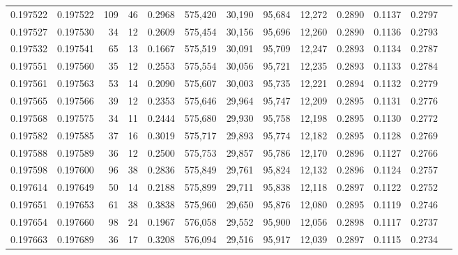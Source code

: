 \begin{tabular}{rrrrrrrrrrrrr}
0.197522 & 0.197522 &   109 &  46 &                                     0.2968 & 575,420 &  30,190 &  95,684 &  12,272 & 0.2890 & 0.1137 & 0.2797 \\
0.197527 & 0.197530 &    34 &  12 &                                     0.2609 & 575,454 &  30,156 &  95,696 &  12,260 & 0.2890 & 0.1136 & 0.2793 \\
0.197532 & 0.197541 &    65 &  13 &                                     0.1667 & 575,519 &  30,091 &  95,709 &  12,247 & 0.2893 & 0.1134 & 0.2787 \\
0.197551 & 0.197560 &    35 &  12 &                                     0.2553 & 575,554 &  30,056 &  95,721 &  12,235 & 0.2893 & 0.1133 & 0.2784 \\
0.197561 & 0.197563 &    53 &  14 &                                     0.2090 & 575,607 &  30,003 &  95,735 &  12,221 & 0.2894 & 0.1132 & 0.2779 \\
0.197565 & 0.197566 &    39 &  12 &                                     0.2353 & 575,646 &  29,964 &  95,747 &  12,209 & 0.2895 & 0.1131 & 0.2776 \\
0.197568 & 0.197575 &    34 &  11 &                                     0.2444 & 575,680 &  29,930 &  95,758 &  12,198 & 0.2895 & 0.1130 & 0.2772 \\
0.197582 & 0.197585 &    37 &  16 &                                     0.3019 & 575,717 &  29,893 &  95,774 &  12,182 & 0.2895 & 0.1128 & 0.2769 \\
0.197588 & 0.197589 &    36 &  12 &                                     0.2500 & 575,753 &  29,857 &  95,786 &  12,170 & 0.2896 & 0.1127 & 0.2766 \\
0.197598 & 0.197600 &    96 &  38 &                                     0.2836 & 575,849 &  29,761 &  95,824 &  12,132 & 0.2896 & 0.1124 & 0.2757 \\
0.197614 & 0.197649 &    50 &  14 &                                     0.2188 & 575,899 &  29,711 &  95,838 &  12,118 & 0.2897 & 0.1122 & 0.2752 \\
0.197651 & 0.197653 &    61 &  38 &                                     0.3838 & 575,960 &  29,650 &  95,876 &  12,080 & 0.2895 & 0.1119 & 0.2746 \\
0.197654 & 0.197660 &    98 &  24 &                                     0.1967 & 576,058 &  29,552 &  95,900 &  12,056 & 0.2898 & 0.1117 & 0.2737 \\
0.197663 & 0.197689 &    36 &  17 &                                     0.3208 & 576,094 &  29,516 &  95,917 &  12,039 & 0.2897 & 0.1115 & 0.2734 \\

\end{tabular}
